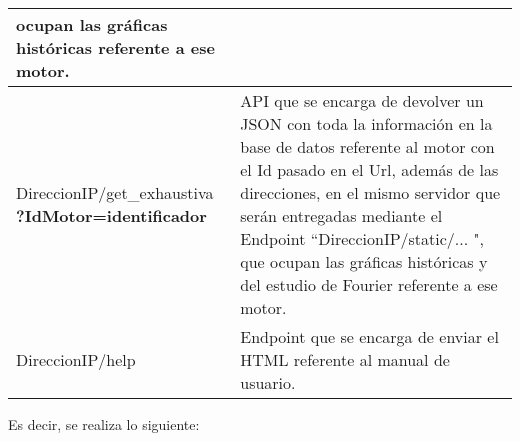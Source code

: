 \begin{table}[ht]
\begin{center}
\begin{tabular}{|p{5cm}|p{10cm}|}
                ocupan las gráficas históricas referente a ese motor.
                \\\hline
                DireccionIP/get\_exhaustiva \textbf{?IdMotor=identificador}&
                API que se encarga de devolver un JSON con toda la información
                en la base de datos referente al motor con el Id pasado en el
                Url, además de las direcciones, en el mismo servidor que serán
                entregadas mediante el Endpoint ``DireccionIP/static/... ", que
                ocupan las gráficas históricas y del estudio de Fourier
                referente a ese motor.
                \\\hline
                DireccionIP/help&
                Endpoint que se encarga de enviar el HTML referente al manual
                de usuario.
                \\\hline
            \end{tabular}

        \end{center}

    \end{table}

    Es decir, se realiza lo siguiente:

